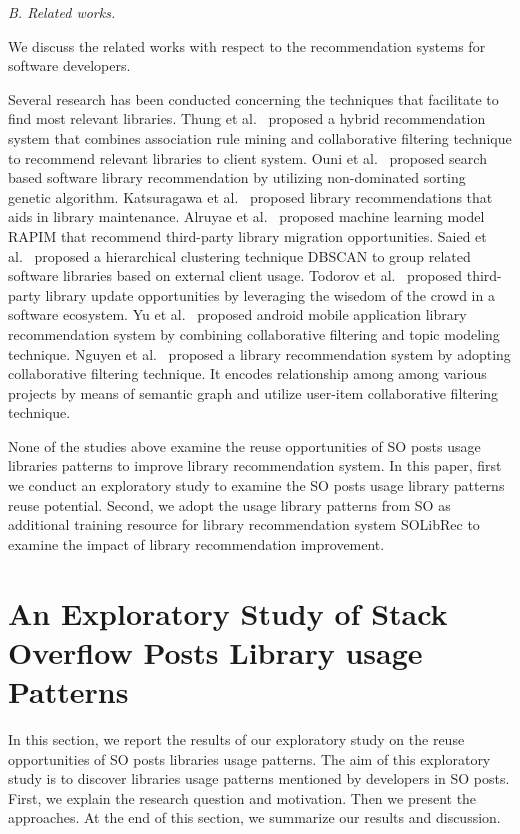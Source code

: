 \documentclass[paper]{ieice}
\begin{document}
\noindent\textit{B. Related works.}

We discuss the related works with respect to the recommendation systems for software developers. 

Several research has been conducted concerning the techniques that facilitate to find most relevant libraries. Thung et al.~\cite{thung2013automated} proposed a hybrid recommendation system that combines association rule mining  and collaborative filtering technique to recommend relevant libraries to client system. Ouni et al.~\cite{ouni2017search} proposed search based software library recommendation by utilizing non-dominated sorting genetic algorithm. Katsuragawa et al.~\cite{katsuragawa2018maintaining} proposed library recommendations that aids in library maintenance. Alruyae et al.~\cite{alrubaye2020learning} proposed machine learning model RAPIM that recommend third-party library migration opportunities. Saied et al.~\cite{saied2018improving} proposed a hierarchical clustering technique DBSCAN to group related software libraries based on external client usage. Todorov et al.~\cite{todorov2017sol} proposed third-party library update opportunities by leveraging the wisedom of the crowd in a software ecosystem. Yu et al.~\cite{yu2017combining} proposed android mobile application library recommendation system by combining collaborative filtering and topic modeling technique. Nguyen et al.~\cite{nguyen2020crossrec} proposed a library recommendation system by adopting collaborative filtering technique. It encodes relationship among among various projects by means of semantic graph and utilize user-item collaborative filtering technique. 

None of the studies above examine the reuse opportunities of SO posts usage libraries patterns to improve library recommendation system. In this paper, first we conduct an exploratory study to examine the SO posts usage library patterns reuse potential. Second, we adopt the usage library patterns from SO as additional training resource for library recommendation system SOLibRec to examine the impact of library recommendation improvement.



\section{An Exploratory Study of Stack Overflow Posts Library usage Patterns}
\label{sec:prelimanary}
In this section, we report the results of our exploratory study on the reuse opportunities of SO posts libraries usage patterns.
The aim of this exploratory study is to discover libraries usage patterns mentioned by developers in SO posts. First, we explain the research question and motivation. Then we present the approaches. At the end of this section, we summarize our results and discussion. 
\\
\end{document}
